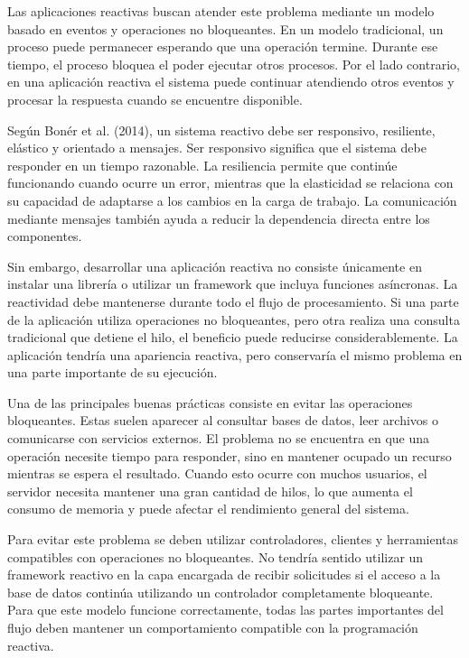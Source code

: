 \documentclass[12pt,letterpaper]{article}
\begin{document}
Las aplicaciones reactivas buscan atender este problema mediante un modelo basado en eventos y operaciones no bloqueantes. En un modelo tradicional, un proceso puede permanecer esperando que una operación termine. Durante ese tiempo, el proceso bloquea el poder ejecutar otros procesos. Por el lado contrario, en una aplicación reactiva el sistema puede continuar atendiendo otros eventos y procesar la respuesta cuando se encuentre disponible.

Según Bonér et al. (2014), un sistema reactivo debe ser responsivo, resiliente, elástico y orientado a mensajes. Ser responsivo significa que el sistema debe responder en un tiempo razonable. La resiliencia permite que continúe funcionando cuando ocurre un error, mientras que la elasticidad se relaciona con su capacidad de adaptarse a los cambios en la carga de trabajo. La comunicación mediante mensajes también ayuda a reducir la dependencia directa entre los componentes.

Sin embargo, desarrollar una aplicación reactiva no consiste únicamente en instalar una librería o utilizar un framework que incluya funciones asíncronas. La reactividad debe mantenerse durante todo el flujo de procesamiento. Si una parte de la aplicación utiliza operaciones no bloqueantes, pero otra realiza una consulta tradicional que detiene el hilo, el beneficio puede reducirse considerablemente. La aplicación tendría una apariencia reactiva, pero conservaría el mismo problema en una parte importante de su ejecución.

Una de las principales buenas prácticas consiste en evitar las operaciones bloqueantes. Estas suelen aparecer al consultar bases de datos, leer archivos o comunicarse con servicios externos. El problema no se encuentra en que una operación necesite tiempo para responder, sino en mantener ocupado un recurso mientras se espera el resultado. Cuando esto ocurre con muchos usuarios, el servidor necesita mantener una gran cantidad de hilos, lo que aumenta el consumo de memoria y puede afectar el rendimiento general del sistema.

Para evitar este problema se deben utilizar controladores, clientes y herramientas compatibles con operaciones no bloqueantes. No tendría sentido utilizar un framework reactivo en la capa encargada de recibir solicitudes si el acceso a la base de datos continúa utilizando un controlador completamente bloqueante. Para que este modelo funcione correctamente, todas las partes importantes del flujo deben mantener un comportamiento compatible con la programación reactiva.
\end{document}
